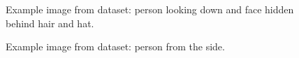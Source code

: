 \documentclass[12pt, a4paper]{article}
\begin{document}
\begin{figure}
    \caption{Example image from dataset: person looking down and face hidden behind hair and hat.}
    \label{fig:wrongDirectionImage}
\end{figure}
\begin{figure}
    \caption{Example image from dataset: person from the side.}
    \label{fig:wrongDirectionImage2}
\end{figure}
\end{document}
